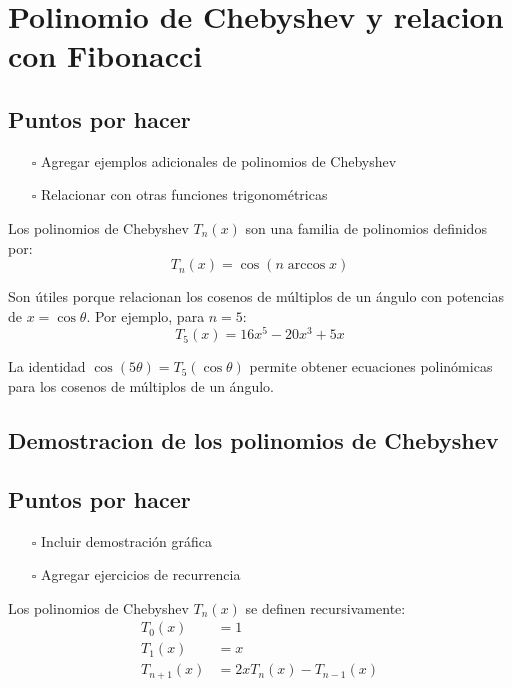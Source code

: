 \section{Polinomio de Chebyshev y relacion con Fibonacci}\label{sec:chebfib}

\subsection{Puntos por hacer}
\begin{itemize}
  \item[$\square$] Agregar ejemplos adicionales de polinomios de Chebyshev
  \item[$\square$] Relacionar con otras funciones trigonométricas
\end{itemize}

Los polinomios de Chebyshev $T_n(x)$ son una familia de polinomios definidos por:
\begin{equation*}
T_n(x) = \cos(n \arccos x)
\end{equation*}

Son útiles porque relacionan los cosenos de múltiplos de un ángulo con potencias de $x = \cos \theta$. Por ejemplo, para $n=5$:
\begin{equation*}
T_5(x) = 16x^5 - 20x^3 + 5x
\end{equation*}

La identidad $\cos(5\theta) = T_5(\cos \theta)$ permite obtener ecuaciones polinómicas para los cosenos de múltiplos de un ángulo.

\subsection{Demostracion de los polinomios de Chebyshev}

\subsection{Puntos por hacer}
\begin{itemize}
  \item[$\square$] Incluir demostración gráfica
  \item[$\square$] Agregar ejercicios de recurrencia
\end{itemize}

Los polinomios de Chebyshev $T_n(x)$ se definen recursivamente:
\begin{align*}
T_0(x) &= 1 \\
T_1(x) &= x \\
T_{n+1}(x) &= 2x T_n(x) - T_{n-1}(x)
\end{align*}

